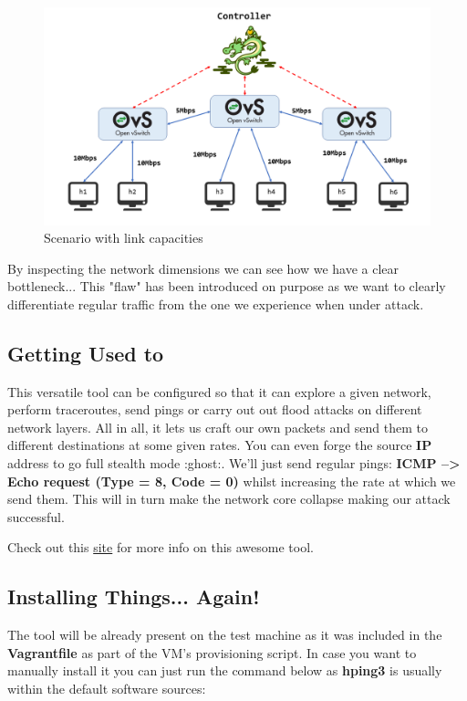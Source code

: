 \documentclass[12pt]{report}
\newcommand{\newpar} {
    \vskip 1cm
}
\begin{document}
				\begin{figure}
					\centering
					\includegraphics[scale = 1]{scenario_limits.png}
					\caption{Scenario with link capacities}
					\label{f:limited}
				\end{figure}

				By inspecting the network dimensions we can see how we have a clear bottleneck... This "flaw" has been introduced on purpose as we want to clearly differentiate regular traffic from the one we experience when under attack.

		\subsection{Getting Used to }
			This versatile tool can be configured so that it can explore a given network, perform traceroutes, send pings or carry out out flood attacks on different network layers. All in all, it lets us craft our own packets and send them to different destinations at some given rates. You can even forge the source \textbf{IP} address to go full stealth mode :ghost:. We'll just send regular pings: \textbf{ICMP --> Echo request (Type = 8, Code = 0)} whilst increasing the rate at which we send them. This will in turn make the network core collapse making our attack successful.
			\newpar
			Check out this \href{https://tools.kali.org/information-gathering/hping3}{site} for more info on this awesome tool.

		\subsection{Installing Things... Again!}
			The tool will be already present on the test machine as it was included in the \textbf{Vagrantfile} as part of the VM's provisioning script. In case you want to manually install it you can just run the command below as \textbf{hping3} is usually within the default software sources:
\end{document}
